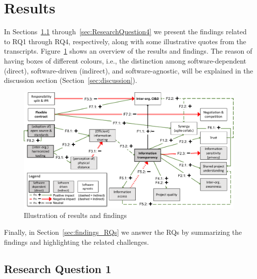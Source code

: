 \section{Results}\label{sec:results}



In Sections~\ref{sec:ResearchQuestion1} through~\ref{sec:ResearchQuestion4} we present the findings related to RQ1 through RQ4, respectively, along with some illustrative quotes from the transcripts. 
Figure~\ref{fig:results} shows an overview of the results and findings. The reason of having boxes of different colours, i.e., the distinction among software-dependent (direct), software-driven (indirect), and software-agnostic, will be explained in the discussion section (Section~\ref{sec:discussion}).
%
\begin{figure}[htb]
\vspace{-.2cm}
\centering
\includegraphics[width=.8\textwidth]{figure/results2.pdf}
\vspace{-.3cm}
\caption{Illustration of results and findings}
\label{fig:results}
\vspace{-.2cm}
\end{figure}
%
Finally, in Section~\ref{sec:findings_RQs} we answer the RQs by summarizing the findings and highlighting the related challenges.

\subsection{Research Question 1}\label{sec:ResearchQuestion1}

